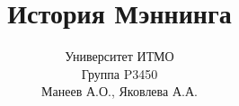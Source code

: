 \title{История Мэннинга}
	\author{Университет ИТМО\\
		Группа P3450\\
		Манеев А.О., Яковлева А.А.\\
		}
	\date{}
\maketitle
